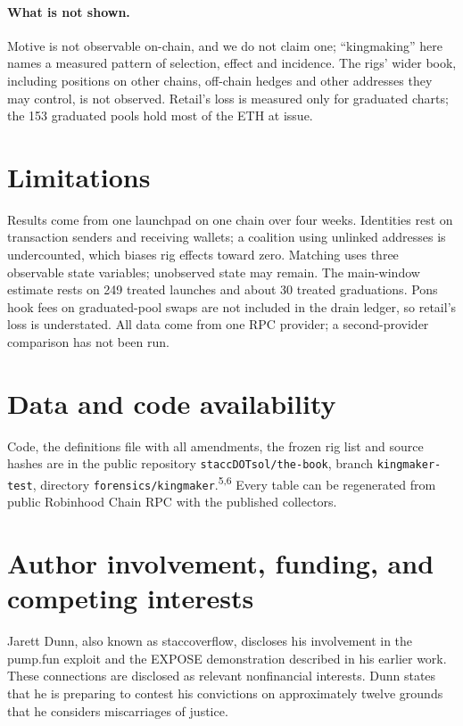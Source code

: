 \documentclass{ledger}
\newcommand{\n}[1]{\textsuperscript{#1}}
\begin{document}
\paragraph{What is not shown.} Motive is not observable on-chain, and we do not claim one; ``kingmaking'' here names a measured pattern of selection, effect and incidence. The rigs' wider book, including positions on other chains, off-chain hedges and other addresses they may control, is not observed. Retail's loss is measured only for graduated charts; the 153 graduated pools hold most of the ETH at issue.

\section{Limitations}\label{limitations}

Results come from one launchpad on one chain over four weeks. Identities rest on transaction senders and receiving wallets; a coalition using unlinked addresses is undercounted, which biases rig effects toward zero. Matching uses three observable state variables; unobserved state may remain. The main-window estimate rests on 249 treated launches and about 30 treated graduations. Pons hook fees on graduated-pool swaps are not included in the drain ledger, so retail's loss is understated. All data come from one RPC provider; a second-provider comparison has not been run.

\section{Data and code availability}\label{availability}

Code, the definitions file with all amendments, the frozen rig list and source hashes are in the public repository \texttt{staccDOTsol/the-book}, branch \texttt{kingmaker-test}, directory \texttt{forensics/kingmaker}.\n{5,6} Every table can be regenerated from public Robinhood Chain RPC with the published collectors.

\section{Author involvement, funding, and competing interests}\label{interests}

Jarett Dunn, also known as staccoverflow, discloses his involvement in the pump.fun exploit and the EXPOSE demonstration described in his earlier work. These connections are disclosed as relevant nonfinancial interests. Dunn states that he is preparing to contest his convictions on approximately twelve grounds that he considers miscarriages of justice.
\end{document}
